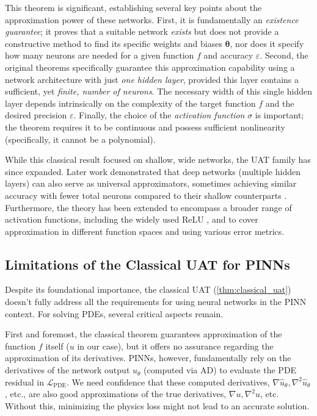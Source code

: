 This theorem is significant, establishing several key points about the approximation power of these networks.
First, it is fundamentally an \emph{existence guarantee}; it proves that a suitable network \emph{exists} but does not provide a constructive method to find its specific weights and biases $\boldsymbol{\theta}$, nor does it specify how many neurons are needed for a given function $f$ and accuracy $\varepsilon$. Second, the original theorems specifically guarantee this approximation capability using a network architecture with just \emph{one hidden layer}, provided this layer contains a sufficient, yet \emph{finite, number of neurons}. The necessary width of this single hidden layer depends intrinsically on the complexity of the target function $f$ and the desired precision $\varepsilon$. Finally, the choice of the \emph{activation function} $\sigma$ is important; the theorem requires it to be continuous and possess sufficient nonlinearity (specifically, it cannot be a polynomial).

While this classical result focused on shallow, wide networks, the UAT family has since expanded. Later work demonstrated that deep networks (multiple hidden layers) can also serve as universal approximators, sometimes achieving similar accuracy with fewer total neurons compared to their shallow counterparts \cite{lu2017expressive, telgarsky2016benefits}. Furthermore, the theory has been extended to encompass a broader range of activation functions, including the widely used ReLU \cite{yarotsky2017error}, and to cover approximation in different function spaces and using various error metrics.

\subsection{Limitations of the Classical UAT for PINNs}

Despite its foundational importance, the classical UAT (\cref{thm:classical_uat}) doesn't fully address all the requirements for using neural networks in the PINN context. For solving PDEs, several critical aspects remain.

First and foremost, the classical theorem guarantees approximation of the function $f$ itself ($u$ in our case), but it offers no assurance regarding the approximation of its derivatives. PINNs, however, fundamentally rely on the derivatives of the network output $\hat{u}_\theta$ (computed via AD) to evaluate the PDE residual in $\mathcal{L}_{\text{PDE}}$. We need confidence that these computed derivatives, $\nabla \hat{u}_\theta, \nabla^2 \hat{u}_\theta$, etc., are also good approximations of the true derivatives, $\nabla u, \nabla^2 u$, etc. Without this, minimizing the physics loss might not lead to an accurate solution.

